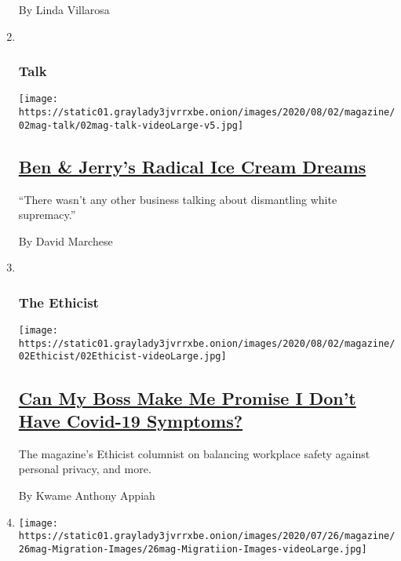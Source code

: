 \begin{enumerate}
  By Linda Villarosa
\item ~
  \hypertarget{talk}{%
  \subsubsection{Talk}\label{talk}}

  \texttt{[image: https://static01.graylady3jvrrxbe.onion/images/2020/08/02/magazine/02mag-talk/02mag-talk-videoLarge-v5.jpg]}

  \hypertarget{ben--jerrys-radical-ice-cream-dreams}{%
  \subsection{\texorpdfstring{\href{/interactive/2020/07/27/magazine/ben-jerry-interview.html}{Ben
  \& Jerry's Radical Ice Cream
  Dreams}}{Ben \& Jerry's Radical Ice Cream Dreams}}\label{ben--jerrys-radical-ice-cream-dreams}}

  ``There wasn't any other business talking about dismantling white
  supremacy.''

  By David Marchese
\item ~
  \hypertarget{the-ethicist}{%
  \subsubsection{The Ethicist}\label{the-ethicist}}

  \texttt{[image: https://static01.graylady3jvrrxbe.onion/images/2020/08/02/magazine/02Ethicist/02Ethicist-videoLarge.jpg]}

  \hypertarget{can-my-boss-make-me-promise-i-dont-have-covid-19-symptoms}{%
  \subsection{\texorpdfstring{\href{/2020/07/28/magazine/can-my-boss-make-me-promise-i-dont-have-covid-19-symptoms.html}{Can
  My Boss Make Me Promise I Don't Have Covid-19
  Symptoms?}}{Can My Boss Make Me Promise I Don't Have Covid-19 Symptoms?}}\label{can-my-boss-make-me-promise-i-dont-have-covid-19-symptoms}}

  The magazine's Ethicist columnist on balancing workplace safety
  against personal privacy, and more.

  By Kwame Anthony Appiah
\item
  \texttt{[image: https://static01.graylady3jvrrxbe.onion/images/2020/07/26/magazine/26mag-Migration-Images/26mag-Migratiion-Images-videoLarge.jpg]}


\end{enumerate}
